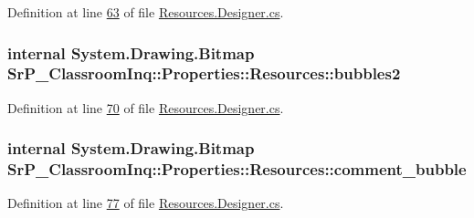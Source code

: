 \-Definition at line \hyperlink{_resources_8_designer_8cs_source_l00063}{63} of file \hyperlink{_resources_8_designer_8cs_source}{\-Resources.\-Designer.\-cs}.

\hypertarget{class_sr_p___classroom_inq_1_1_properties_1_1_resources_ae15d966afaa44ab7f083fa1bb1cf1c82}{
\subsubsection[{bubbles2}]{\setlength{\rightskip}{0pt plus 5cm}internal \-System.\-Drawing.\-Bitmap \-Sr\-P\-\_\-\-Classroom\-Inq\-::\-Properties\-::\-Resources\-::bubbles2}}
\label{class_sr_p___classroom_inq_1_1_properties_1_1_resources_ae15d966afaa44ab7f083fa1bb1cf1c82}


\-Definition at line \hyperlink{_resources_8_designer_8cs_source_l00070}{70} of file \hyperlink{_resources_8_designer_8cs_source}{\-Resources.\-Designer.\-cs}.

\hypertarget{class_sr_p___classroom_inq_1_1_properties_1_1_resources_a2ca7de7a89e9cc488bc2e7ca92f49c94}{
\subsubsection[{comment\-\_\-bubble}]{\setlength{\rightskip}{0pt plus 5cm}internal \-System.\-Drawing.\-Bitmap \-Sr\-P\-\_\-\-Classroom\-Inq\-::\-Properties\-::\-Resources\-::comment\-\_\-bubble}}
\label{class_sr_p___classroom_inq_1_1_properties_1_1_resources_a2ca7de7a89e9cc488bc2e7ca92f49c94}


\-Definition at line \hyperlink{_resources_8_designer_8cs_source_l00077}{77} of file \hyperlink{_resources_8_designer_8cs_source}{\-Resources.\-Designer.\-cs}.


